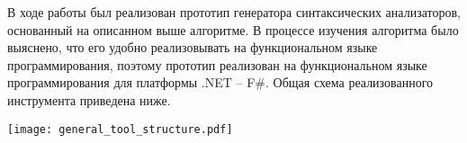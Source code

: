 
В ходе работы был реализован прототип генератора синтаксических анализаторов, основанный на описанном выше алгоритме. В процессе изучения алгоритма было выяснено, что его удобно реализовывать на функциональном языке программирования, поэтому  прототип реализован на функциональном языке программирования для платформы .NET -- F\#. Общая схема реализованного инструмента приведена ниже.


\begin{center}
  \texttt{[image: general\_tool\_structure.pdf]}
	\label{fig:general_tool_structure}
\end{center}

